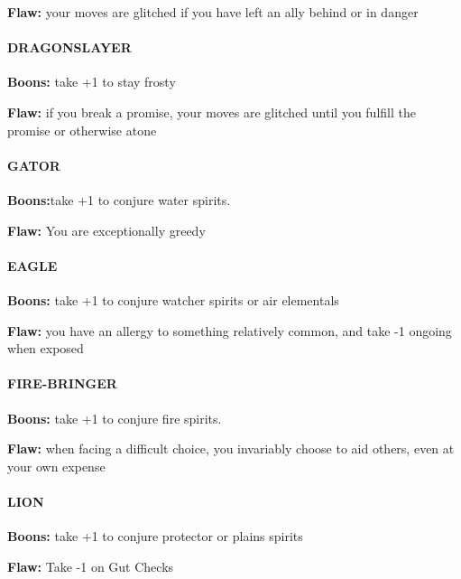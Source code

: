 \documentclass[oneside,10pt]{article}
\begin{document}
\begin{multicols}{2}
\begin{dent}
\textbf{Flaw:} your moves are glitched if you have left an ally
behind or in danger
\end{dent}


\paragraph{DRAGONSLAYER}
\begin{dent}
\textbf{Boons:} take +1 to stay frosty

\textbf{Flaw:} if you break a promise, your moves are glitched until you fulfill the promise or otherwise atone
\end{dent}

\paragraph{GATOR}
\begin{dent}
\textbf{Boons:}take +1 to conjure water spirits.

\textbf{Flaw:} You are exceptionally greedy
\end{dent}


\paragraph{EAGLE}
\begin{dent}
\textbf{Boons:} take +1 to conjure watcher spirits or air elementals

\textbf{Flaw:} you have an allergy to something relatively common, and take -1 ongoing when exposed
\end{dent}

\paragraph{FIRE-BRINGER}
\begin{dent}
\textbf{Boons:} take +1 to conjure fire spirits.

\textbf{Flaw:} when facing a difficult choice, you invariably choose to aid others, even at your own expense
\end{dent}


\paragraph{LION}
\begin{dent}
\textbf{Boons:} take +1 to conjure protector or plains spirits

\textbf{Flaw:} Take -1 on Gut Checks
\end{dent}


\end{multicols}
\end{document}
